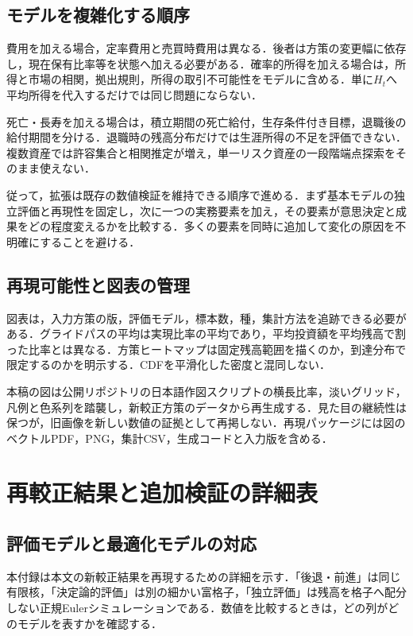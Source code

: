 \documentclass[11pt,a4paper]{article}
\numberwithin{equation}{section}
\numberwithin{table}{section}
\numberwithin{figure}{section}
\theoremstyle{plain}
\theoremstyle{definition}
\begin{document}
\subsection{モデルを複雑化する順序}
費用を加える場合，定率費用と売買時費用は異なる．後者は方策の変更幅に依存し，現在保有比率等を状態へ加える必要がある．確率的所得を加える場合は，所得と市場の相関，拠出規則，所得の取引不可能性をモデルに含める．単に$H_t$へ平均所得を代入するだけでは同じ問題にならない．

死亡・長寿を加える場合は，積立期間の死亡給付，生存条件付き目標，退職後の給付期間を分ける．退職時の残高分布だけでは生涯所得の不足を評価できない．複数資産では許容集合と相関推定が増え，単一リスク資産の一段階端点探索をそのまま使えない．

従って，拡張は既存の数値検証を維持できる順序で進める．まず基本モデルの独立評価と再現性を固定し，次に一つの実務要素を加え，その要素が意思決定と成果をどの程度変えるかを比較する．多くの要素を同時に追加して変化の原因を不明確にすることを避ける．

\subsection{再現可能性と図表の管理}
図表は，入力方策の版，評価モデル，標本数，種，集計方法を追跡できる必要がある．グライドパスの平均は実現比率の平均であり，平均投資額を平均残高で割った比率とは異なる．方策ヒートマップは固定残高範囲を描くのか，到達分布で限定するのかを明示する．CDFを平滑化した密度と混同しない．

本稿の図は公開リポジトリの日本語作図スクリプトの横長比率，淡いグリッド，凡例と色系列を踏襲し，新較正方策のデータから再生成する．見た目の継続性は保つが，旧画像を新しい数値の証拠として再掲しない．再現パッケージには図のベクトルPDF，PNG，集計CSV，生成コードと入力版を含める．

\FloatBarrier
\section{再較正結果と追加検証の詳細表}
\label{app:numerical-tables}
\subsection{評価モデルと最適化モデルの対応}
本付録は本文の新較正結果を再現するための詳細を示す．「後退・前進」は同じ有限核，「決定論的評価」は別の細かい富格子，「独立評価」は残高を格子へ配分しない正規Eulerシミュレーションである．数値を比較するときは，どの列がどのモデルを表すかを確認する．
\end{document}
